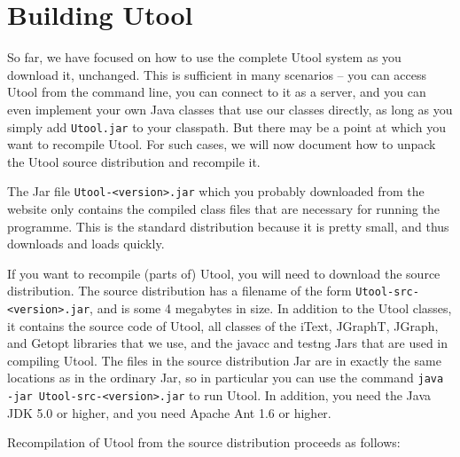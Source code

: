
\section{Building Utool} \label{sec:building}

So far, we have focused on how to use the complete Utool system as you
download it, unchanged. This is sufficient in many scenarios -- you
can access Utool from the command line, you can connect to it as a
server, and you can even implement your own Java classes that use our
classes directly, as long as you simply add \verb?Utool.jar? to your
classpath. But there may be a point at which you want to recompile
Utool. For such cases, we will now document how to unpack the Utool
source distribution and recompile it.

The Jar file \verb?Utool-<version>.jar? which you probably downloaded
from the website only contains the compiled class files that are
necessary for running the programme. This is the standard distribution
because it is pretty small, and thus downloads and loads quickly.

If you want to recompile (parts of) Utool, you will need to download
the source distribution. The source distribution has a filename of the
form \verb?Utool-src-<version>.jar?, and is some 4 megabytes in
size. In addition to the Utool classes, it contains the source code of
Utool, all classes of the iText, JGraphT, JGraph, and Getopt libraries
that we use, and the javacc and testng Jars that are used in compiling
Utool. The files in the source distribution Jar are in exactly the
same locations as in the ordinary Jar, so in particular you can use
the command \verb?java -jar Utool-src-<version>.jar? to run Utool. In
addition, you need the Java JDK 5.0 or higher, and you need Apache Ant
1.6 or higher.

Recompilation of Utool from the source distribution proceeds as
follows:

